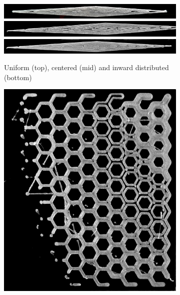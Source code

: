 {\begin{figure}
\centering
\begin{subfigure}{\columnwidth}\centering
\setlength{\figwidth}{\columnwidth}
\includegraphics[width=\figwidth]{sources-applications-P3-print-wedge-naive-edited.png}
\includegraphics[width=\figwidth]{sources-applications-P3-print-wedge-center-edited.png}
\includegraphics[width=\figwidth]{sources-applications-P3-print-wedge-inward-edited.png}
\caption{Uniform (top), centered (mid) and inward distributed (bottom)}\label{wedge_print}
\end{subfigure}
\setlength{\figheight}{.38\columnwidth}
\setlength{\figheightTwo}{.47\columnwidth}
\setlength{\figwidth}{0.32\columnwidth}
\begin{subfigure}{\figwidth}\centering
\includegraphics[height=\figheight]{sources-applications-P3-print-hex-naive-edited.png}

\end{subfigure}
\end{figure}}
